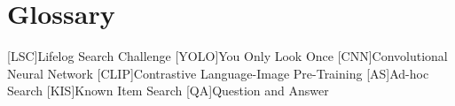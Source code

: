 \chapter{Glossary}

\footnotesize
\SingleSpacing

\begin{multicols}{2}
\begin{acronym}[AAAAAA]

    [LSC]{Lifelog Search Challenge}
    [YOLO]{You Only Look Once}
    [CNN]{Convolutional Neural Network}
    [CLIP]{Contrastive Language-Image Pre-Training}
    [AS]{Ad-hoc Search}
    [KIS]{Known Item Search}
    [QA]{Question and Answer}
\end{acronym}
\end{multicols}

